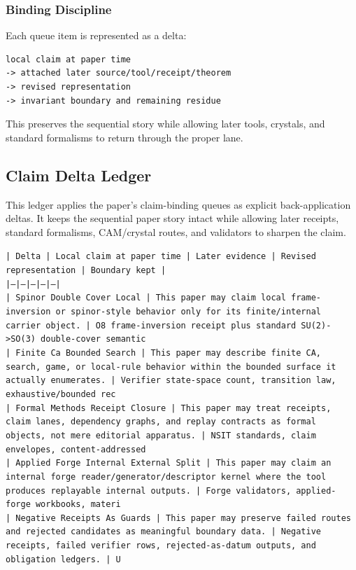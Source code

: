 \documentclass[11pt]{article}
\begin{document}
\subsubsection*{Binding Discipline}

Each queue item is represented as a delta:

\begin{verbatim}
local claim at paper time
-> attached later source/tool/receipt/theorem
-> revised representation
-> invariant boundary and remaining residue
\end{verbatim}

This preserves the sequential story while allowing later tools, crystals, and
standard formalisms to return through the proper lane.

\subsection*{Claim Delta Ledger}

This ledger applies the paper's claim-binding queues as explicit back-application
deltas. It keeps the sequential paper story intact while allowing later
receipts, standard formalisms, CAM/crystal routes, and validators to sharpen the
claim.

\noindent\texttt{| Delta | Local claim at paper time | Later evidence | Revised representation | Boundary kept |}\\
\noindent\texttt{|---|---|---|---|---|}\\
\noindent\texttt{| Spinor Double Cover Local | This paper may claim local frame-inversion or spinor-style behavior only for its finite/internal carrier object. | O8 frame-inversion receipt plus standard SU(2)->SO(3) double-cover semantic}\\
\noindent\texttt{| Finite Ca Bounded Search | This paper may describe finite CA, search, game, or local-rule behavior within the bounded surface it actually enumerates. | Verifier state-space count, transition law, exhaustive/bounded rec}\\
\noindent\texttt{| Formal Methods Receipt Closure | This paper may treat receipts, claim lanes, dependency graphs, and replay contracts as formal objects, not mere editorial apparatus. | NSIT standards, claim envelopes, content-addressed}\\
\noindent\texttt{| Applied Forge Internal External Split | This paper may claim an internal forge reader/generator/descriptor kernel where the tool produces replayable internal outputs. | Forge validators, applied-forge workbooks, materi}\\
\noindent\texttt{| Negative Receipts As Guards | This paper may preserve failed routes and rejected candidates as meaningful boundary data. | Negative receipts, failed verifier rows, rejected-as-datum outputs, and obligation ledgers. | U}\\
\end{document}

